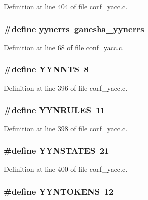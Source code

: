 Definition at line 404 of file conf\_\-yacc.c.
\subsubsection[{yynerrs}]{\setlength{\rightskip}{0pt plus 5cm}\#define {\bf yynerrs}~ganesha\_\-yynerrs}\label{conf__yacc_8c_956a31a9c729bfe871bb770d99e1942d}




Definition at line 68 of file conf\_\-yacc.c.
\subsubsection[{YYNNTS}]{\setlength{\rightskip}{0pt plus 5cm}\#define YYNNTS~8}\label{conf__yacc_8c_f54ae9e588f0ecc32eabbfdf1959df10}




Definition at line 396 of file conf\_\-yacc.c.
\subsubsection[{YYNRULES}]{\setlength{\rightskip}{0pt plus 5cm}\#define YYNRULES~11}\label{conf__yacc_8c_ceaba8997dc3867478ae3b816647eb7c}




Definition at line 398 of file conf\_\-yacc.c.
\subsubsection[{YYNSTATES}]{\setlength{\rightskip}{0pt plus 5cm}\#define YYNSTATES~21}\label{conf__yacc_8c_2c387ba2caaade8bf8f78ed30023f79f}




Definition at line 400 of file conf\_\-yacc.c.
\subsubsection[{YYNTOKENS}]{\setlength{\rightskip}{0pt plus 5cm}\#define YYNTOKENS~12}\label{conf__yacc_8c_75d260730a6c379a94ea28f63a7b9275}





